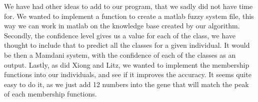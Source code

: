 \documentclass[a4paper,12pt]{article}
\begin{document}
We have had other ideas to add to our program, that we sadly did not have time for.
We wanted to implement a function to create a matlab fuzzy system file, this way we can work in matlab on the knowledge base created by our algorithm.
Secondly, the confidence level gives us a value for each of the class, we have thought to include that to predict all the classes for a given individual. It would be then a Mamdani system, with the confidence of each of the classes as an output.
Lastly, as did Xiong and Litz, we wanted to implement the membership functions into our individuals, and see if it improves the accuracy. It seems quite easy to do it, as we just add 12 numbers into the gene that will match the peak of each membership functions.

 


\end{document}
